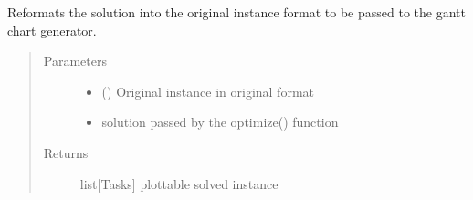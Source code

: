 \documentclass[letterpaper,10pt,english]{sphinxmanual}
\begin{document}
\begin{fulllineitems}
\begin{fulllineitems}
\begin{quote}
\begin{description}
\end{description}\end{quote}

\end{fulllineitems}


\begin{fulllineitems}
\label{\detokenize{agents.solver:agents.solver.solver.OrToolSolver.parse_to_plottable_format}}
\sphinxAtStartPar
Reformats the solution into the original instance format to be passed to the gantt chart generator.
\begin{quote}\begin{description}
\item[{Parameters}] \leavevmode\begin{itemize}
\item {} 
\sphinxAtStartPar
{} (\sphinxstyleliteralemphasis{\sphinxupquote{{[}}}\sphinxstyleliteralemphasis{\sphinxupquote{{]}}}) \textendash{} Original instance in original format

\item {} 
\sphinxAtStartPar
{} \textendash{} solution passed by the optimize() function

\end{itemize}

\item[{Returns}] \leavevmode
\sphinxAtStartPar
list{[}Tasks{]} plottable solved instance

\end{description}\end{quote}

\end{fulllineitems}


\end{fulllineitems}
\end{document}
